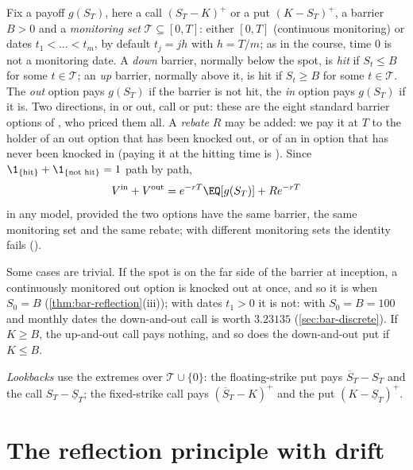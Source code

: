 Fix a payoff $g(S_T)$, here a call $(S_T-K)^+$ or a put $(K-S_T)^+$, a barrier $B>0$ and a
\emph{monitoring set} $\mathcal T\subseteq[0,T]$: either $[0,T]$ (continuous monitoring) or
dates $t_1<\dots<t_m$, by default $t_j=jh$ with $h=T/m$; as in the course, time $0$ is not a
monitoring date. A \emph{down} barrier, normally below the spot, is \emph{hit} if $S_t\le B$ for
some $t\in\mathcal T$; an \emph{up} barrier, normally above it, is hit if $S_t\ge B$ for some
$t\in\mathcal T$. The \emph{out} option pays $g(S_T)$ if the barrier is not
hit, the \emph{in} option pays $g(S_T)$ if it is. Two directions, in or out, call or put: these
are the eight standard barrier options of \textcite{rubinstein-reiner-1991}, who priced them all.
A \emph{rebate} $R$ may be added: we pay it at $T$ to the holder of an out option that has been
knocked out, or of an in option that has never been knocked in (paying it at the hitting time is
). Since $\1_{\{\text{hit}\}}+\1_{\{\text{not hit}\}}=1$ path by path,
\begin{equation}\label{eq:bar-parity}
  V^{\mathrm{in}}+V^{\mathrm{out}}=e^{-rT}\EQ[g(S_T)]+Re^{-rT}
\end{equation}
in any model, provided the two options have the same barrier, the same monitoring set and the
same rebate; with different monitoring sets the identity fails ().

Some cases are trivial. If the spot is on the far side of the barrier at inception, a
continuously monitored out option is knocked out at once, and so it is when $S_0=B$
(\cref{thm:bar-reflection}(iii)); with dates $t_1>0$ it is not: with $S_0=B=100$ and monthly
dates the down-and-out call is worth $3.23135$ (\cref{sec:bar-discrete}). If
$K\ge B$, the up-and-out call pays nothing, and so does the down-and-out put if $K\le B$.

\emph{Lookbacks} use the extremes over $\mathcal T\cup\{0\}$: the floating-strike put pays
$\overline S_T-S_T$ and the call $S_T-\underline S_T$; the fixed-strike call pays $(\overline S_T-K)^+$
and the put $(K-\underline S_T)^+$.

\section{The reflection principle with drift}\label{sec:bar-reflection}

